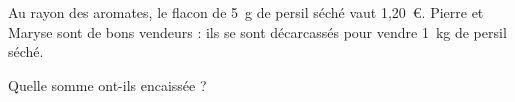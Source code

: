 Au rayon des aromates, le flacon de 5~g de persil séché vaut
1,20~\textgreek{\euro}. Pierre et Maryse sont de bons vendeurs : ils
se sont décarcassés pour vendre 1~kg de persil séché.\par Quelle somme
ont-ils encaissée ?